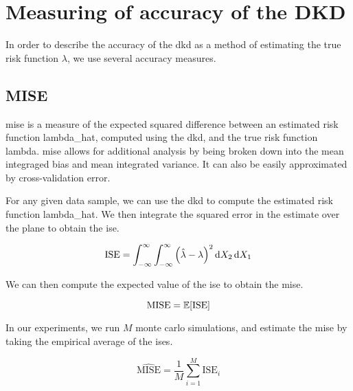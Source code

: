 \section{Measuring of accuracy of the DKD}
\label{sec:method:accuracy}

In order to describe the accuracy of the \gls{dkd} as a method of estimating the true risk function \(\lambda\),
we use several accuracy measures.

\subsection{MISE}
\label{subsec:method:MISE}

\Gls{mise} is a measure of the expected squared difference between an estimated risk function \gls{lambda_hat},
computed using the \gls{dkd}, and the true risk function \gls{lambda}.
\Gls{mise} allows for additional analysis by being broken down into the mean integraged bias and mean integrated variance.
It can also be easily approximated by cross-validation error.

For any given data sample, we can use the \gls{dkd} to compute the estimated risk function \gls{lambda_hat}.
We then integrate the squared error in the estimate over the plane to obtain the \gls{ise}.

\begin{equation}
    \mbox{ISE} = \int_{-\infty}^{\infty} \int_{-\infty}^{\infty} \left( \hat{\lambda} - \lambda \right)^2 \mathop{}\!\mathrm{d}{X_2} \mathop{}\!\mathrm{d}{X_1}
\end{equation}

We can then compute the expected value of the \gls{ise} to obtain the \gls{mise}.

\begin{equation}
    \mbox{MISE} = \mathbb{E} [\mbox{ISE}]
\end{equation}

In our experiments, we run \(M\) monte carlo simulations, and estimate the \gls{mise} by taking the empirical average of the \glspl{ise}.

\begin{equation}
    \hat{\mbox{MISE}} = \frac{1}{M} \sum_{i=1}^{M} \mbox{ISE}_i
\end{equation}

